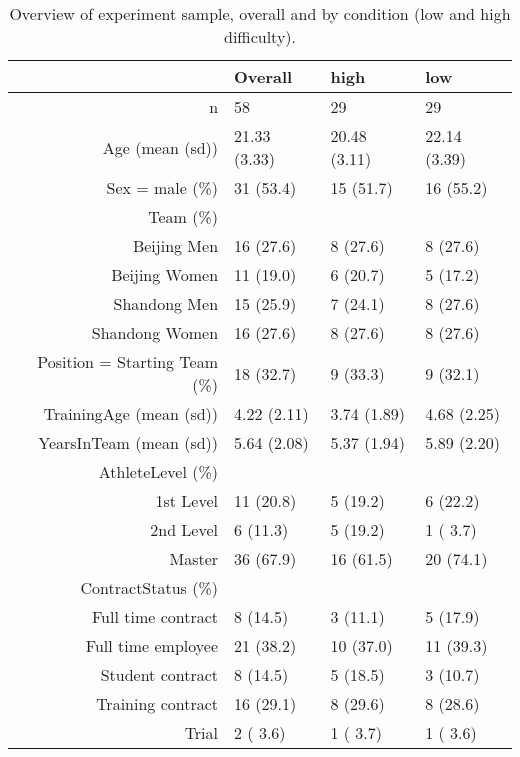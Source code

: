 \begin{table}[ht]
\centering
\begin{tabular}{rlll}
  \hline
 & Overall & high & low \\ 
  \hline
n &    58 &    29 &    29 \\ 
  Age (mean (sd)) & 21.33 (3.33) & 20.48 (3.11) & 22.14 (3.39) \\ 
  Sex = male (\%) &    31 (53.4)  &    15 (51.7)  &    16 (55.2)  \\ 
  Team (\%) &     &     &     \\ 
     Beijing Men &    16 (27.6)  &     8 (27.6)  &     8 (27.6)  \\ 
     Beijing Women &    11 (19.0)  &     6 (20.7)  &     5 (17.2)  \\ 
     Shandong Men &    15 (25.9)  &     7 (24.1)  &     8 (27.6)  \\ 
     Shandong Women &    16 (27.6)  &     8 (27.6)  &     8 (27.6)  \\ 
  Position = Starting Team (\%) &    18 (32.7)  &     9 (33.3)  &     9 (32.1)  \\ 
  TrainingAge (mean (sd)) &  4.22 (2.11) &  3.74 (1.89) &  4.68 (2.25) \\ 
  YearsInTeam (mean (sd)) &  5.64 (2.08) &  5.37 (1.94) &  5.89 (2.20) \\ 
  AthleteLevel (\%) &     &     &     \\ 
     1st Level &    11 (20.8)  &     5 (19.2)  &     6 (22.2)  \\ 
     2nd Level &     6 (11.3)  &     5 (19.2)  &     1 ( 3.7)  \\ 
     Master &    36 (67.9)  &    16 (61.5)  &    20 (74.1)  \\ 
  ContractStatus (\%) &     &     &     \\ 
     Full time contract &     8 (14.5)  &     3 (11.1)  &     5 (17.9)  \\ 
     Full time employee &    21 (38.2)  &    10 (37.0)  &    11 (39.3)  \\ 
     Student contract &     8 (14.5)  &     5 (18.5)  &     3 (10.7)  \\ 
     Training contract &    16 (29.1)  &     8 (29.6)  &     8 (28.6)  \\ 
     Trial &     2 ( 3.6)  &     1 ( 3.7)  &     1 ( 3.6)  \\ 
   \hline
\end{tabular}
\caption{Overview of experiment sample, overall and by condition (low and high difficulty).} 
\label{tab:athleteDescriptivesTrainingOverall}
\end{table}
